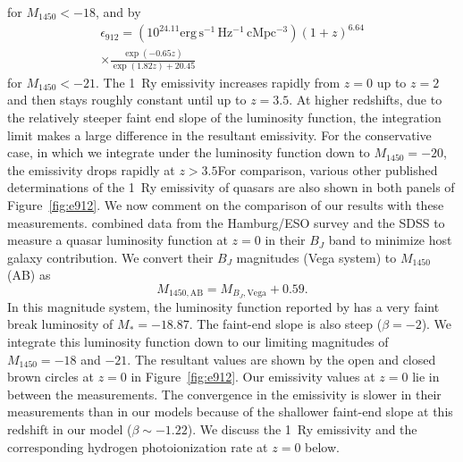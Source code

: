 \documentclass[a4paper,fleqn,usenatbib]{mnras}
\begin{document}
for $M_{1450}<-18$, and by 
\begin{multline}
  \epsilon_{912}=(10^{24.11}\mathrm{erg\, s^{-1}\, Hz^{-1}\, cMpc^{-3}})(1+z)^{6.64}\\\times\frac{\exp(-0.65z)}{\exp(1.82z)+20.45}
\end{multline}
for $M_{1450}<-21$.  The 1~Ry emissivity increases rapidly from $z=0$
up to $z=2$ and then stays roughly constant until up to $z=3.5$.  At
higher redshifts, due to the relatively steeper faint end slope of the
luminosity function, the integration limit makes a large difference in
the resultant emissivity.  For the conservative case, in which we
integrate under the luminosity function down to $M_{1450}=-20$, the
emissivity drops rapidly at $z>3.5$For comparison, various other
published determinations of the 1~Ry emissivity of quasars are also
shown in both panels of Figure~\ref{fig:e912}.  We now comment on the
comparison of our results with these measurements.
\citet{2009A&A...507..781S} combined data from the Hamburg/ESO survey
and the SDSS to measure a quasar luminosity function at $z=0$ in their
$B_J$ band to minimize host galaxy contribution.  We convert their
$B_J$ magnitudes (Vega system) to $M_{1450}$ (AB) as
\begin{equation}
  M_{1450,\mathrm{AB}}=M_{B_J, \mathrm{Vega}}+0.59.  
\end{equation}
In this magnitude system, the luminosity function reported by
\citet{2009A&A...507..781S} has a very faint break luminosity of
$M_*=-18.87$.  The faint-end slope is also steep ($\beta=-2$).  We
integrate this luminosity function down to our limiting magnitudes of
$M_{1450}=-18$ and $-21$.  The resultant values are shown by the open
and closed brown circles at $z=0$ in Figure~\ref{fig:e912}.  Our
emissivity values at $z=0$ lie in between the
\citet{2009A&A...507..781S} measurements.  The convergence in the
emissivity is slower in their measurements than in our models because
of the shallower faint-end slope at this redshift in our model
($\beta\sim -1.22$).  We discuss the 1~Ry emissivity and the
corresponding hydrogen photoionization rate at $z=0$ below.
\end{document}
